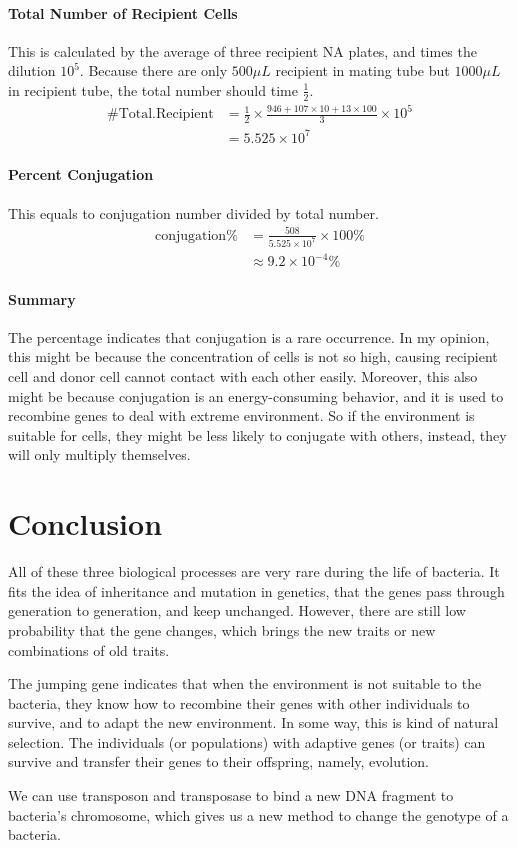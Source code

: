 \documentclass{ctexart}
\begin{document}
			\paragraph{Total Number of Recipient Cells} This is calculated by the average of three recipient NA plates, and times the dilution $10 ^ {5}$. Because there are only $500 \mu L$ recipient in mating tube but $1000 \mu L$ in recipient tube, the total number should time $\frac{1}{2}$.
			$$
			\begin{aligned}
			\#\text{Total.Recipient} &= \frac{1}{2} \times \frac{946 + 107 \times 10 + 13 \times 100}{3} \times 10 ^{5}\\
			&= 5.525 \times 10 ^ 7
			\end{aligned}
			$$ 
			
			\paragraph{Percent Conjugation} This equals to conjugation number divided by total number.
			$$
			\begin{aligned}
			\text{conjugation}\% &= \frac{508}{5.525 \times 10 ^ 7}\times 100 \%\\
			&\approx 9.2 \times 10 ^ {-4}\%
			\end{aligned}
			$$

			\paragraph{Summary} The percentage indicates that conjugation is a rare occurrence. In my opinion, this might be because the concentration of cells is not so high, causing recipient cell and donor cell cannot contact with each other easily. Moreover, this also might be because conjugation is an energy-consuming behavior, and it is used to recombine genes to deal with extreme environment. So if the environment is suitable for cells, they might be less likely to conjugate with others, instead, they will only multiply themselves.

	\section{Conclusion}
		All of these three biological processes are very rare during the life of bacteria. It fits the idea of inheritance and mutation in genetics, that the genes pass through generation to generation, and keep unchanged. However, there are still low probability that the gene changes, which brings the new traits or new combinations of old traits. 

		The jumping gene indicates that when the environment is not suitable to the bacteria, they know how to recombine their genes with other individuals to survive, and to adapt the new environment. In some way, this is kind of natural selection. The individuals (or populations) with adaptive genes (or traits) can survive and transfer their genes to their offspring, namely, evolution.

		We can use transposon and transposase to bind a new DNA fragment to bacteria's chromosome, which gives us a new method to change the genotype of a bacteria. 
\end{document}
